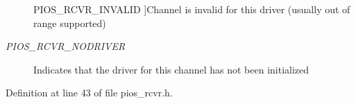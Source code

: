 \begin{Desc}
\begin{description}
{\hypertarget{group___p_i_o_s___r_c_v_r_ggab3256a57f692c2f2784d914ad5a5895da3ed95ffc05faba3edae14cc920cad3cb}{P\-I\-O\-S\-\_\-\-R\-C\-V\-R\-\_\-\-I\-N\-V\-A\-L\-I\-D}\label{group___p_i_o_s___r_c_v_r_ggab3256a57f692c2f2784d914ad5a5895da3ed95ffc05faba3edae14cc920cad3cb}
}]Channel is invalid for this driver (usually out of range supported) \item[{\em 
\hypertarget{group___p_i_o_s___r_c_v_r_ggab3256a57f692c2f2784d914ad5a5895da8408e57d6177365df6cce65e8692880a}{P\-I\-O\-S\-\_\-\-R\-C\-V\-R\-\_\-\-N\-O\-D\-R\-I\-V\-E\-R}\label{group___p_i_o_s___r_c_v_r_ggab3256a57f692c2f2784d914ad5a5895da8408e57d6177365df6cce65e8692880a}
}]Indicates that the driver for this channel has not been initialized \end{description}
\end{Desc}


Definition at line 43 of file pios\-\_\-rcvr.\-h.

